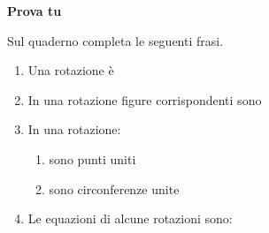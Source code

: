 \textbf{Prova tu}

Sul quaderno completa le seguenti frasi.
\begin{enumerate} [noitemsep]
\item Una rotazione è
\item In una rotazione figure corrispondenti sono
\item In una rotazione:
\begin{enumerate} [noitemsep]
\item sono punti uniti
\item sono circonferenze unite
\end{enumerate}
\item Le equazioni di alcune rotazioni sono:
\end{enumerate}

